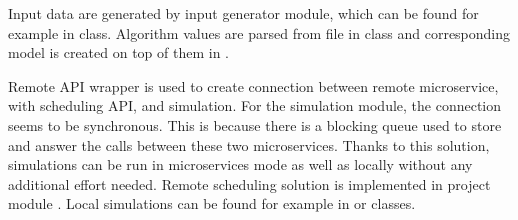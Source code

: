 Input data are generated by input generator module,
which can be found for example in  class.
Algorithm values are parsed from file in class  
and corresponding model is created on top of them in .

Remote API wrapper is used to create connection between remote microservice, with scheduling API, and simulation.
For the simulation module,
the connection seems to be synchronous.
This is because there is a blocking queue used to store and answer the calls between these two microservices.
Thanks to this solution,
simulations can be run in microservices mode as well as locally without any additional effort needed.
Remote scheduling solution is implemented in project module .
Local simulations can be found for example in  or  classes.